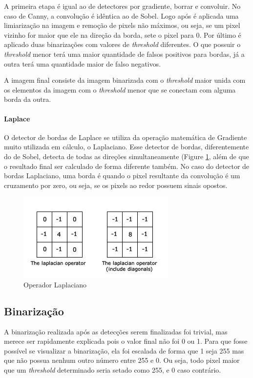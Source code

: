 \documentclass[10pt,twocolumn,letterpaper]{article}
\begin{document}
A primeira etapa é igual ao de detectores por gradiente, borrar e convoluir. No caso de Canny, a convolução é idêntica ao de Sobel. Logo após é aplicada uma limiarização na imagem e remoção de pixels não máximos, ou seja, se um pixel vizinho for maior que ele na direção da borda, sete o pixel para 0. Por último é aplicado duas binarizações com valores de \emph{threshold} diferentes. O que possuir o \emph{threshold} menor terá uma maior quantidade de falsos positivos para bordas, já a outra terá uma quantidade maior de falso negativos.

A imagem final consiste da imagem binarizada com o \emph{threshold} maior unida com os elementos da imagem com o \emph{threshold} menor que se conectam com alguma borda da outra.\cite{canny}

\paragraph{Laplace}
O detector de bordas de Laplace se utiliza da operação matemática de Gradiente muito utilizada em cálculo, o Laplaciano. Esse detector de bordas, diferentemente do de Sobel, detecta de todas as direções simultaneamente (Figure \ref{fig:LaplaceKernel}, além de que o resultado final ser calculado de forma diferente também. No caso do detector de bordas Laplaciano, uma borda é quando o pixel resultante da convolução é um cruzamento por zero, ou seja, se os pixels ao redor possuem sinais opostos.\cite{laplace}

\begin{figure}[!htp]
\centering
\includegraphics[width=\columnwidth]{LaplaceKernel}
\caption{Operador Laplaciano}
\label{fig:LaplaceKernel}
\end{figure}

\subsection{Binarização}
A binarização realizada após as detecções serem finalizadas foi trivial, mas merece ser rapidamente explicada pois o valor final não foi 0 ou 1. Para que fosse possível se visualizar a binarização, ela foi escalada de forma que 1 seja 255 mas que não possua nenhum outro número entre 255 e 0. Ou seja, todo pixel maior que um \emph{threshold} determinado seria setado como 255, e 0 caso contrário.
\end{document}

